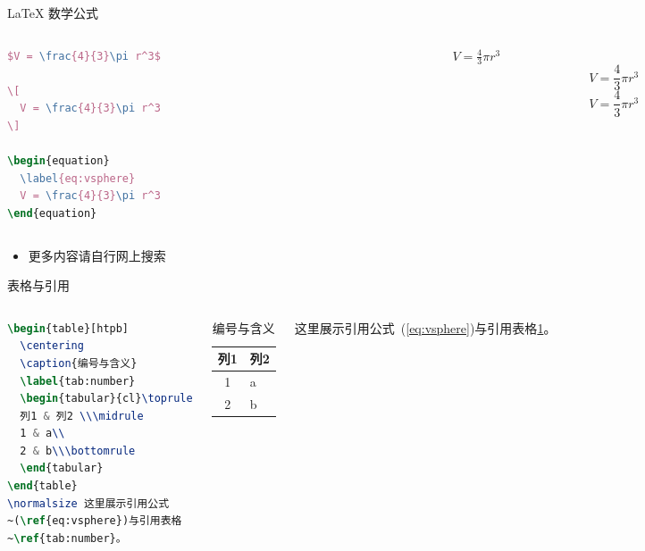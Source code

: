 \documentclass{beamer}
\begin{document}
\begin{frame}[fragile]{\LaTeX{} 数学公式}
    \begin{columns}
        \begin{column}{.55\textwidth}
\begin{lstlisting}[language=TeX]
$V = \frac{4}{3}\pi r^3$

\[
  V = \frac{4}{3}\pi r^3
\]

\begin{equation}
  \label{eq:vsphere}
  V = \frac{4}{3}\pi r^3
\end{equation}
\end{lstlisting}
        \end{column}
        \begin{column}{.4\textwidth}
            $V = \frac{4}{3}\pi r^3$
            \[
                V = \frac{4}{3}\pi r^3
            \]
            \begin{equation}
                \label{eq:vsphere}
                V = \frac{4}{3}\pi r^3
            \end{equation}
        \end{column}
    \end{columns}
    \begin{itemize}
        \item 更多内容请自行网上搜索
    \end{itemize}
\end{frame}

\begin{frame}[fragile]{表格与引用}
    \begin{columns}
\begin{lstlisting}[language=TeX]
\begin{table}[htpb]
  \centering
  \caption{编号与含义}
  \label{tab:number}
  \begin{tabular}{cl}\toprule
  列1 & 列2 \\\midrule
  1 & a\\
  2 & b\\\bottomrule
  \end{tabular}
\end{table}
\normalsize 这里展示引用公式
~(\ref{eq:vsphere})与引用表格
~\ref{tab:number}。
\end{lstlisting}
        \begin{table}[htpb]
            \centering
            \caption{编号与含义}
            \label{tab:number}
            \begin{tabular}{cl}\toprule
                列1 & 列2 \\\midrule
                1 & a\\
                2 & b\\\bottomrule
            \end{tabular}
        \end{table}
        \normalsize 这里展示引用公式~(\ref{eq:vsphere})与引用表格\ref{tab:number}。
    \end{columns}
\end{frame}
\end{document}

